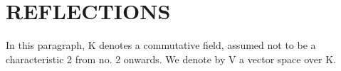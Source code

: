 \section{REFLECTIONS}

In this paragraph, K denotes a commutative field, assumed not to be a characteristic 2 from no. 2 onwards. We denote by V a vector space over K.


